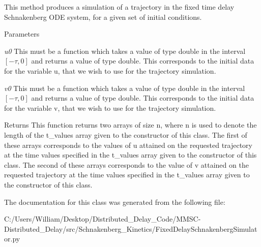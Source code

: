 This method produces a simulation of a trajectory in the fixed time delay Schnakenberg ODE system, for a given set of initial conditions. 


\begin{DoxyParams}{Parameters}
\item[{\em u0}]This must be a function which takes a value of type double in the interval $ [-\tau, 0] $ and returns a value of type double. This corresponds to the initial data for the variable u, that we wish to use for the trajectory simulation. \item[{\em v0}]This must be a function which takes a value of type double in the interval $ [-\tau, 0] $ and returns a value of type double. This corresponds to the initial data for the variable v, that we wish to use for the trajectory simulation. \end{DoxyParams}
\begin{DoxyReturn}{Returns}
This function returns two arrays of size n, where n is used to denote the length of the t\_\-values array given to the constructor of this class. The first of these arrays corresponds to the values of u attained on the requested trajectory at the time values specified in the t\_\-values array given to the constructor of this class. The second of these arrays corresponds to the value of v attained on the requested trajectory at the time values specified in the t\_\-values array given to the constructor of this class. 
\end{DoxyReturn}


The documentation for this class was generated from the following file:\begin{DoxyCompactItemize}
\item 
C:/Users/William/Desktop/Distributed\_\-Delay\_\-Code/MMSC-\/Distributed\_\-Delay/src/Schnakenberg\_\-Kinetics/FixedDelaySchnakenbergSimulator.py\end{DoxyCompactItemize}
